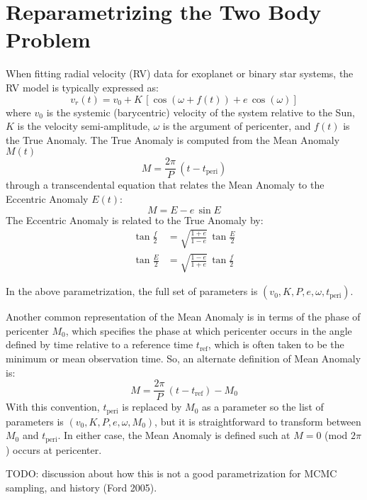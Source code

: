 \documentclass{article}
\begin{document}
\section{Reparametrizing the Two Body Problem}

When fitting radial velocity (RV) data for exoplanet or binary star systems, the
RV model is typically expressed as:
\begin{equation}
    v_r(t) = v_0 + K\,\left[\cos(\omega + f(t)) + e\,\cos(\omega)\right]
\end{equation}
where $v_0$ is the systemic (barycentric) velocity of the system relative to the
Sun, $K$ is the velocity semi-amplitude, $\omega$ is the argument of pericenter,
and $f(t)$ is the True Anomaly. The True Anomaly is computed from the Mean
Anomaly $M(t)$
\begin{equation}
    M = \frac{2\pi}{P} \, (t - t_{\mathrm{peri}})
\end{equation}
through a transcendental equation that relates the Mean Anomaly to the Eccentric
Anomaly $E(t)$:
\begin{equation}
    M = E - e\,\sin E
\end{equation}
The Eccentric Anomaly is related to the True Anomaly by:
\begin{align}
    \tan\frac{f}{2} &= \sqrt{\frac{1+e}{1-e}} \, \tan\frac{E}{2} \\
    \tan\frac{E}{2} &= \sqrt{\frac{1-e}{1+e}} \, \tan\frac{f}{2}
\end{align}

In the above parametrization, the full set of parameters is $(v_0, K, P, e,
\omega, t_{\mathrm{peri}})$.

Another common representation of the Mean Anomaly is in terms of the phase of
pericenter $M_0$, which specifies the phase at which pericenter occurs in the
angle defined by time relative to a reference time $t_{\mathrm{ref}}$, which is
often taken to be the minimum or mean observation time. So, an alternate
definition of Mean Anomaly is:
$$
    M = \frac{2\pi}{P} \, (t - t_{\mathrm{ref}}) - M_0
$$
With this convention, $t_{\mathrm{peri}}$ is replaced by $M_0$ as a parameter so
the list of parameters is $(v_0, K, P, e, \omega, M_0)$, but it is
straightforward to transform between $M_0$ and $t_{\mathrm{peri}}$. In either
case, the Mean Anomaly is defined such at $M=0$ (mod $2\pi$) occurs at
pericenter.

TODO: discussion about how this is not a good parametrization for MCMC sampling,
and history (Ford 2005).
\end{document}
